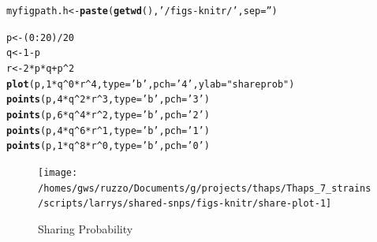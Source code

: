 \documentclass{article}\usepackage[]{graphicx}\usepackage[]{color}
\makeatletter
\newcommand{\hlnum}[1]{\textcolor[rgb]{0.686,0.059,0.569}{#1}}%
\newcommand{\hlstr}[1]{\textcolor[rgb]{0.192,0.494,0.8}{#1}}%
\newcommand{\hlopt}[1]{\textcolor[rgb]{0,0,0}{#1}}%
\newcommand{\hlstd}[1]{\textcolor[rgb]{0.345,0.345,0.345}{#1}}%
\newcommand{\hlkwb}[1]{\textcolor[rgb]{0.69,0.353,0.396}{#1}}%
\newcommand{\hlkwc}[1]{\textcolor[rgb]{0.333,0.667,0.333}{#1}}%
\newcommand{\hlkwd}[1]{\textcolor[rgb]{0.737,0.353,0.396}{\textbf{#1}}}%
\newenvironment{kframe}{%
 \def\at@end@of@kframe{}%
 \ifinner\ifhmode%
  \def\at@end@of@kframe{\end{minipage}}%
  \begin{minipage}{\columnwidth}%
 \fi\fi%
 \def\FrameCommand##1{\hskip\@totalleftmargin \hskip-\fboxsep
 \colorbox{shadecolor}{##1}\hskip-\fboxsep
     \hskip-\linewidth \hskip-\@totalleftmargin \hskip\columnwidth}%
 \MakeFramed {\advance\hsize-\width
   \@totalleftmargin\z@ \linewidth\hsize
   \@setminipage}}%
 {\par\unskip\endMakeFramed%
 \at@end@of@kframe}
\newenvironment{knitrout}{}{} %
\makeatother
\begin{document}
\begin{knitrout}\footnotesize
{}\color{fgcolor}\begin{kframe}
\begin{alltt}
\hlstd{myfigpath.h} \hlkwb{<-} \hlkwd{paste}\hlstd{(}\hlkwd{getwd}\hlstd{(),} \hlstr{'/figs-knitr/'}\hlstd{,} \hlkwc{sep}\hlstd{=}\hlstr{''}\hlstd{)}
\end{alltt}
\end{kframe}
\end{knitrout}

\begin{knitrout}\footnotesize
{}\color{fgcolor}\begin{kframe}
\begin{alltt}
\hlstd{p} \hlkwb{<-} \hlstd{(}\hlnum{0}\hlopt{:}\hlnum{20}\hlstd{)}\hlopt{/}\hlnum{20}
\hlstd{q} \hlkwb{<-} \hlnum{1}\hlopt{-}\hlstd{p}
\hlstd{r} \hlkwb{<-} \hlnum{2}\hlopt{*}\hlstd{p}\hlopt{*}\hlstd{q}\hlopt{+}\hlstd{p}\hlopt{^}\hlnum{2}
\hlkwd{plot}\hlstd{(  p,} \hlnum{1}\hlopt{*}\hlstd{q}\hlopt{^}\hlnum{0}\hlopt{*}\hlstd{r}\hlopt{^}\hlnum{4}\hlstd{,} \hlkwc{type}\hlstd{=}\hlstr{'b'}\hlstd{,}\hlkwc{pch}\hlstd{=}\hlstr{'4'}\hlstd{,} \hlkwc{ylab}\hlstd{=}\hlstr{"share prob"}\hlstd{)}
\hlkwd{points}\hlstd{(p,} \hlnum{4}\hlopt{*}\hlstd{q}\hlopt{^}\hlnum{2}\hlopt{*}\hlstd{r}\hlopt{^}\hlnum{3}\hlstd{,} \hlkwc{type}\hlstd{=}\hlstr{'b'}\hlstd{,}\hlkwc{pch}\hlstd{=}\hlstr{'3'}\hlstd{)}
\hlkwd{points}\hlstd{(p,} \hlnum{6}\hlopt{*}\hlstd{q}\hlopt{^}\hlnum{4}\hlopt{*}\hlstd{r}\hlopt{^}\hlnum{2}\hlstd{,} \hlkwc{type}\hlstd{=}\hlstr{'b'}\hlstd{,}\hlkwc{pch}\hlstd{=}\hlstr{'2'}\hlstd{)}
\hlkwd{points}\hlstd{(p,} \hlnum{4}\hlopt{*}\hlstd{q}\hlopt{^}\hlnum{6}\hlopt{*}\hlstd{r}\hlopt{^}\hlnum{1}\hlstd{,} \hlkwc{type}\hlstd{=}\hlstr{'b'}\hlstd{,}\hlkwc{pch}\hlstd{=}\hlstr{'1'}\hlstd{)}
\hlkwd{points}\hlstd{(p,} \hlnum{1}\hlopt{*}\hlstd{q}\hlopt{^}\hlnum{8}\hlopt{*}\hlstd{r}\hlopt{^}\hlnum{0}\hlstd{,} \hlkwc{type}\hlstd{=}\hlstr{'b'}\hlstd{,}\hlkwc{pch}\hlstd{=}\hlstr{'0'}\hlstd{)}
\end{alltt}
\end{kframe}\begin{figure}

{\centering \texttt{[image: /homes/gws/ruzzo/Documents/g/projects/thaps/Thaps\_7\_strains/scripts/larrys/shared-snps/figs-knitr/share-plot-1]} 

}

\caption[Sharing Probability]{Sharing Probability}\label{fig:share-plot}
\end{figure}


\end{knitrout}
\end{document}
